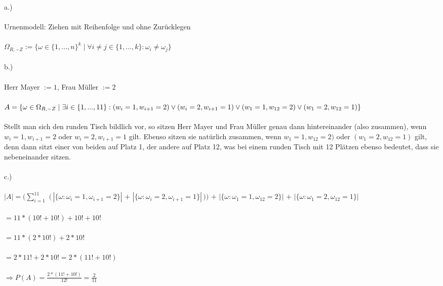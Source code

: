 \documentclass[10pt,a4paper]{article}
\begin{document}
		\begin{text}
			a.) 
			\\
			\\
			Urnenmodell: Ziehen mit Reihenfolge und ohne Zurücklegen
			\\
			\\
			$\Omega_{R,-Z} := \{ \omega \in \{ 1, ..., n \}^k \; | \; \forall i \neq j \in \{ 1, ..., k \} : \omega_i \neq \omega_j \}$
			\\
			\\
			b.)
			\\
			\\
			Herr Mayer $:= 1$, \; Frau Müller $:= 2$
			\\
			\\
			$A = \{ \omega \in \Omega_{R,-Z} \; | \; \exists i \in \{ 1, ... , 11 \} : \\(w_i = 1, w_{i+1} = 2) \vee \\(w_i = 2, w_{i+1} = 1) \vee \\(w_1 = 1, w_{12} = 2) \vee \\(w_1 = 2, w_{12} = 1) \}$
			\\
			\\
			Stellt man sich den runden Tisch bildlich vor, so sitzen Herr Mayer und Frau Müller genau dann hintereinander (also zusammen), wenn $w_i = 1, w_{i+1} = 2$ oder $w_i = 2, w_{i+1} = 1$ gilt. Ebenso sitzen sie natürlich zusammen, wenn $w_1 = 1, w_{12} = 2)$ oder $(w_1 = 2, w_{12} = 1)$ gilt, denn dann sitzt einer von beiden auf Platz 1, der andere auf Platz 12, was bei einem runden Tisch mit 12 Plätzen ebenso bedeutet, dass sie nebeneinander sitzen.
			\\
			\\
			c.)
			\\
			\\
			$|A| = ( \sum_{i=1}^{11}$ 
			$( \, |\{ \omega : \omega_i = 1, \omega_{i+1} = 2\}| $
			$+$
			$|\{ \omega : \omega_i = 2, \omega_{i+1} = 1\}| \,) )$
			$+$
			$|\{ \omega : \omega_1 = 1, \omega_{12} = 2\}|$
			$+$
			$|\{ \omega : \omega_1 = 2, \omega_{12} = 1\}| \;$
			\\
			\\
			$ = 11 * ( 10! + 10! ) + 10! + 10!$
			\\
			\\
			$ = 11 * ( 2 * 10! ) + 2 * 10!$
			\\
			\\
			$ = 2 * 11! + 2 * 10! = 2 * ( 11! + 10! )$
			\\
			\\
			$ \Rightarrow P(A) = \frac{2 * (11! + 10!)}{12!} = \frac{2}{11}$
		\end{text}
\end{document}
